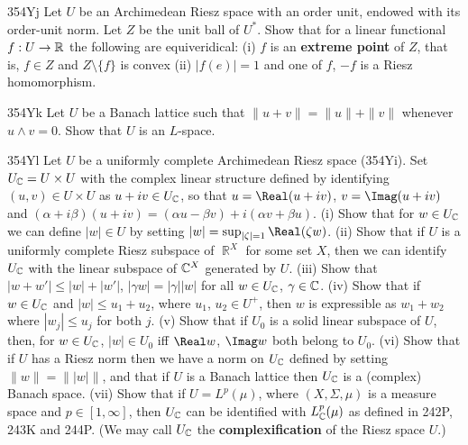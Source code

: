 {\spheader 354Yj Let $U$ be an Archimedean Riesz space with an order unit,
endowed with its order-unit norm.   Let $Z$ be the unit ball
of $U^*$.   Show that for a linear functional $f:U\to\Bbb R$ the
following are equiveridical:  (i) $f$ is an {\bf extreme point} of $Z$,
that is, $f\in Z$ and $Z\setminus\{f\}$ is convex (ii) $|f(e)|=1$ and
one of $f$, $-f$ is a Riesz homomorphism.

\spheader 354Yk Let $U$ be a Banach lattice such that
$\|u+v\|=\|u\|+\|v\|$ whenever $u\wedge v=0$.   Show that $U$ is an
$L$-space.   

\spheader 354Yl Let $U$ be a uniformly complete Archimedean Riesz space
(354Yi).   Set $U_{\Bbb C}=U\times U$ with the complex linear structure
defined
by identifying $(u,v)\in U\times U$ as $u+iv\in U_{\Bbb C}$, so that
$u=\Real(u+iv)$, $v=\Imag(u+iv)$ and
$(\alpha+i\beta)(u+iv)=(\alpha u-\beta v)+i(\alpha v+\beta u)$.   (i)
Show that for $w\in U_{\Bbb C}$ we can define $|w|\in U$ by setting
$|w|=\sup_{|\zeta|=1}\Real(\zeta w)$.   (ii) Show that if $U$ is a
uniformly complete Riesz subspace of $\BbbR^X$ for some set $X$, then we
can identify $U_{\Bbb C}$ with the linear subspace of $\Bbb C^X$
generated by $U$.   (iii) Show that
$|w+w'|\le|w|+|w'|$, $|\gamma w|=|\gamma||w|$ for all $w\in U_{\Bbb C}$,
$\gamma\in\Bbb C$.   (iv) Show that if $w\in U_{\Bbb C}$ and
$|w|\le u_1+u_2$, where $u_1$, $u_2\in U^+$, then $w$ is expressible as
$w_1+w_2$ where $|w_j|\le u_j$ for both $j$.      (v) Show that if $U_0$ is a solid linear
subspace of $U$, then, for $w\in U_{\Bbb C}$, $|w|\in U_0$ iff $\Real
w$, $\Imag w$ both belong to $U_0$.   (vi) Show that if $U$ has a Riesz
norm then we have a norm on $U_{\Bbb C}$ defined by setting
$\|w\|=\||w|\|$, and that if $U$ is a Banach lattice then $U_{\Bbb C}$
is a (complex) Banach space.   (vii) Show
that if $U=L^p(\mu)$, where $(X,\Sigma,\mu)$ is a measure space and
$p\in[1,\infty]$, then $U_{\Bbb C}$ can be identified with
$L^p_{\Bbb C}(\mu)$ as
defined in 242P, 243K and 244P.   (We may call $U_{\Bbb C}$ the {\bf
complexification} of the Riesz space $U$.)

}
